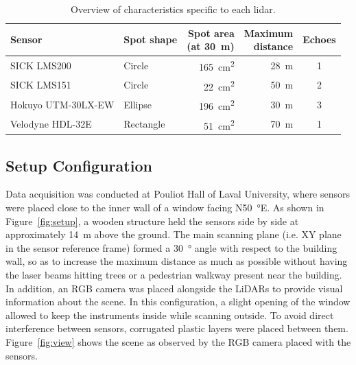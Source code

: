 \begin{table}
    \centering
    \begin{tabular}{@{}llrrc@{}}
        \toprule
        \textbf{Sensor} & \textbf{Spot shape} & \makecell[cc]{\textbf{Spot area} \\ (at \SI{30}{\meter})} & \makecell[cc]{\textbf{Maximum} \\ \textbf{distance}} & \textbf{Echoes} \\
        \hline
        SICK LMS200         & Circle    & \SI{165}{\centi\meter\squared} & \SI{28}{\meter} & 1 \\
        SICK LMS151         & Circle    & \SI{22}{\centi\meter\squared}  & \SI{50}{\meter} & 2 \\
        Hokuyo UTM-30LX-EW  & Ellipse   & \SI{196}{\centi\meter\squared} & \SI{30}{\meter} & 3 \\
        Velodyne HDL-32E    & Rectangle & \SI{51}{\centi\meter\squared}  & \SI{70}{\meter} & 1 \\
        \bottomrule
    \end{tabular}
    \caption[Overview of characteristics specific to each \gls*{lidar}.]{Overview of characteristics specific to each \gls*{lidar}.}
    \label{tab:lidars}
\end{table}

\subsection{Setup Configuration}

Data acquisition was conducted at Pouliot Hall of Laval University, where sensors were placed close to the inner wall of a window facing N\SI{50}{\degree}E. As shown in Figure~\ref{fig:setup}, a wooden structure held the sensors side by side at approximately \SI{14}{\meter} above the ground. The main scanning plane (i.e. XY plane in the sensor reference frame) formed a \SI{30}{\degree} angle with respect to the building wall, so as to increase the maximum distance as much as possible without having the laser beams hitting  trees or a pedestrian walkway present near the building. In addition, an RGB camera was placed alongside the LiDARs to provide visual information about the scene. In this configuration, a slight opening of the window allowed to keep the instruments inside while scanning outside. To avoid direct interference between sensors, corrugated plastic layers were placed between them. Figure~\ref{fig:view} shows the scene as observed by the RGB camera placed with the sensors.


